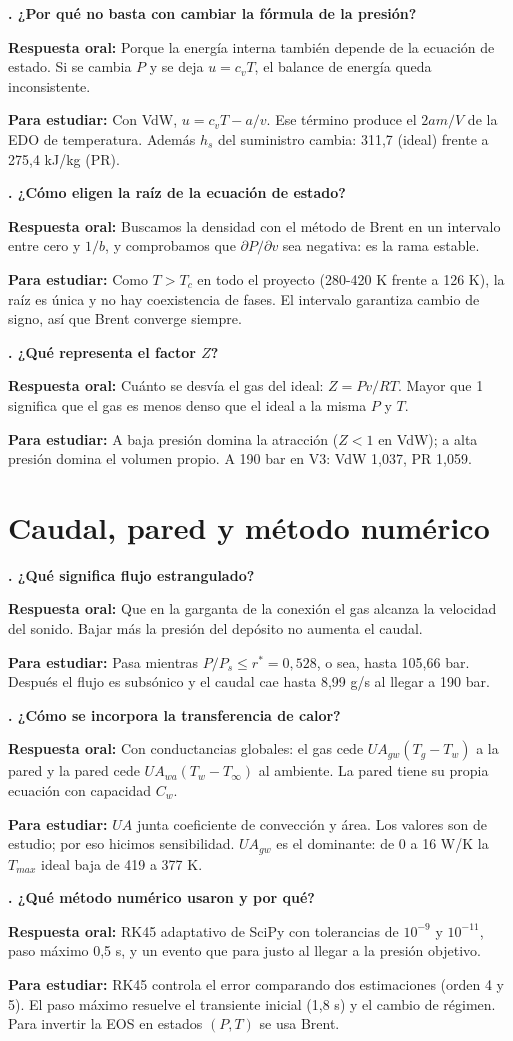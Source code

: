 \documentclass[11pt]{article}
\newcounter{preg}
\newcommand{\pregunta}[3]{\stepcounter{preg}%
\begin{tcolorbox}[colback=white,colframe=tinta!25,boxrule=0.5pt,sharp corners,left=6pt,right=6pt,top=4pt,bottom=4pt,breakable]
\textbf{\color{tinta}\thepreg. #1}\par\smallskip
\textbf{Respuesta oral:} #2\par\smallskip
{\color{gris}\small\textbf{Para estudiar:} #3}
\end{tcolorbox}}
\begin{document}
\pregunta{¿Por qué no basta con cambiar la fórmula de la presión?}
{Porque la energía interna también depende de la ecuación de estado. Si se cambia $P$ y se deja $u=c_vT$, el balance de energía queda inconsistente.}
{Con VdW, $u=c_vT-a/v$. Ese término produce el $2am/V$ de la EDO de temperatura. Además $h_s$ del suministro cambia: 311,7 (ideal) frente a 275,4 kJ/kg (PR).}

\pregunta{¿Cómo eligen la raíz de la ecuación de estado?}
{Buscamos la densidad con el método de Brent en un intervalo entre cero y $1/b$, y comprobamos que $\partial P/\partial v$ sea negativa: es la rama estable.}
{Como $T>T_c$ en todo el proyecto (280-420 K frente a 126 K), la raíz es única y no hay coexistencia de fases.
El intervalo garantiza cambio de signo, así que Brent converge siempre.}

\pregunta{¿Qué representa el factor $Z$?}
{Cuánto se desvía el gas del ideal: $Z=Pv/RT$. Mayor que 1 significa que el gas es menos denso que el ideal a la misma $P$ y $T$.}
{A baja presión domina la atracción ($Z<1$ en VdW); a alta presión domina el volumen propio. A 190 bar en V3: VdW 1,037, PR 1,059.}

\section{Caudal, pared y método numérico}
\pregunta{¿Qué significa flujo estrangulado?}
{Que en la garganta de la conexión el gas alcanza la velocidad del sonido. Bajar más la presión del depósito no aumenta el caudal.}
{Pasa mientras $P/P_s\le r^*=0{,}528$, o sea, hasta 105,66 bar. Después el flujo es subsónico y el caudal cae hasta 8,99 g/s al llegar a 190 bar.}

\pregunta{¿Cómo se incorpora la transferencia de calor?}
{Con conductancias globales: el gas cede $UA_{gw}(T_g-T_w)$ a la pared y la pared cede $UA_{wa}(T_w-T_\infty)$ al ambiente. La pared tiene su propia ecuación con capacidad $C_w$.}
{$UA$ junta coeficiente de convección y área. Los valores son de estudio; por eso hicimos sensibilidad.
$UA_{gw}$ es el dominante: de 0 a 16 W/K la $T_{max}$ ideal baja de 419 a 377 K.}

\pregunta{¿Qué método numérico usaron y por qué?}
{RK45 adaptativo de SciPy con tolerancias de $10^{-9}$ y $10^{-11}$, paso máximo 0,5 s, y un evento que para justo al llegar a la presión objetivo.}
{RK45 controla el error comparando dos estimaciones (orden 4 y 5). El paso máximo resuelve el transiente
inicial (1,8 s) y el cambio de régimen. Para invertir la EOS en estados $(P,T)$ se usa Brent.}
\end{document}
